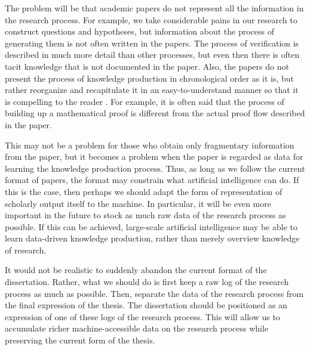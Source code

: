 \documentclass{book}
\begin{document}
The problem will be that academic papers do not represent all the information in the research process. For example, we take considerable pains in our research to construct questions and hypotheses, but information about the process of generating them is not often written in the papers. The process of verification is described in much more detail than other processes, but even then there is often tacit knowledge that is not documented in the paper. Also, the papers do not present the process of knowledge production in chronological order as it is, but rather reorganize and recapitulate it in an easy-to-understand manner so that it is compelling to the reader \cite{schickore2008doing}. For example, it is often said that the process of building up a mathematical proof is different from the actual proof flow described in the paper. 

This may not be a problem for those who obtain only fragmentary information from the paper, but it becomes a problem when the paper is regarded as data for learning the knowledge production process. Thus, as long as we follow the current format of papers, the format may constrain what artificial intelligence can do. If this is the case, then perhaps we should adapt the form of representation of scholarly output itself to the machine. In particular, it will be even more important in the future to stock as much raw data of the research process as possible. If this can be achieved, large-scale artificial intelligence may be able to learn data-driven knowledge production, rather than merely overview knowledge of research.

It would not be realistic to suddenly abandon the current format of the dissertation. Rather, what we should do is first keep a raw log of the research process as much as possible. Then, separate the data of the research process from the final expression of the thesis. The dissertation should be positioned as an expression of one of these logs of the research process. This will allow us to accumulate richer machine-accessible data on the research process while preserving the current form of the thesis.

\end{document}
